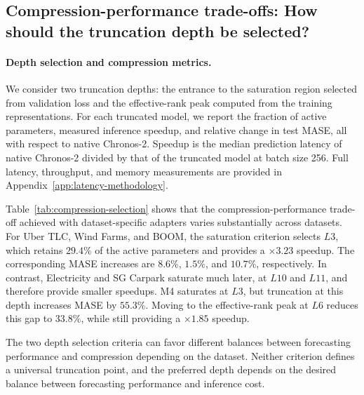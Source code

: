 \documentclass{article}
\begin{document}
\subsection{Compression-performance trade-offs: How should the truncation depth be selected?}
\label{sec:model-setup-cost}

\paragraph{Depth selection and compression metrics.} We consider two truncation depths: the entrance to the saturation region selected from validation loss and the effective-rank peak computed from the training representations. For each truncated model, we report the fraction of active parameters, measured inference speedup, and relative change in test MASE, all with respect to native Chronos-2. Speedup is the median prediction latency of native Chronos-2 divided by that of the truncated model at batch size 256. Full latency, throughput, and memory measurements are provided in Appendix~\ref{app:latency-methodology}.

Table~\ref{tab:compression-selection} shows that the compression-performance trade-off achieved with dataset-specific adapters varies substantially across datasets. For Uber TLC, Wind Farms, and BOOM, the saturation criterion selects \(L3\), which retains \(29.4\%\) of the active parameters and provides a \(\times 3.23\) speedup. The corresponding MASE increases are \(8.6\%\), \(1.5\%\), and \(10.7\%\), respectively. In contrast, Electricity and SG Carpark saturate much later, at \(L10\) and \(L11\), and therefore provide smaller speedups. M4 saturates at \(L3\), but truncation at this depth increases MASE by \(55.3\%\). Moving to the effective-rank peak at \(L6\) reduces this gap to \(33.8\%\), while still providing a \(\times 1.85\) speedup.

The two depth selection criteria can favor different balances between forecasting performance and compression depending on the dataset. Neither criterion defines a universal truncation point, and the preferred depth depends on the desired balance between forecasting performance and inference cost.
\end{document}
